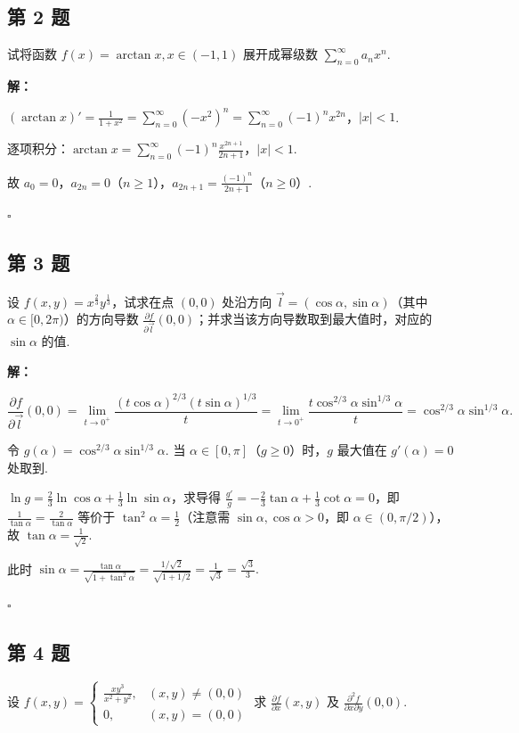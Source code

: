 \documentclass[12pt,a4paper]{article}
\newenvironment{sol}[1][解]{%
  \par\medskip\noindent\textbf{#1：}\itshape\par\noindent\ignorespaces
}{%
  \par\hfill$\square$\par\medskip
}
\begin{document}
\subsection*{第 2 题}
试将函数 $f(x)=\arctan x, x\in(-1,1)$ 展开成幂级数 $\sum_{n=0}^{\infty}a_nx^n$.

\begin{sol}$(\arctan
  x)'=\frac{1}{1+x^2}=\sum_{n=0}^{\infty}(-x^2)^n=\sum_{n=0}^{\infty}(-1)^nx^{2n}$，$|x|<1$.

  逐项积分：$\arctan x=\sum_{n=0}^{\infty}(-1)^n\frac{x^{2n+1}}{2n+1}$，$|x|<1$.

  故 $a_0=0$，$a_{2n}=0$（$n\ge 1$），$a_{2n+1}=\frac{(-1)^n}{2n+1}$（$n\ge 0$）.

\end{sol}
\subsection*{第 3 题}
设 $f(x,y)=x^{\frac{2}{3}}y^{\frac{1}{3}}$，试求在点 $(0,0)$ 处沿方向
$\vec{l}=(\cos\alpha,\sin\alpha)$（其中 $\alpha\in[0,2\pi)$）的方向导数
$\frac{\partial f}{\partial \vec{l}}(0,0)$；并求当该方向导数取到最大值时，对应的 $\sin\alpha$ 的值.

\begin{sol}
  $$\frac{\partial f}{\partial\vec{l}}(0,0)=\lim_{t\to
  0^+}\frac{(t\cos\alpha)^{2/3}(t\sin\alpha)^{1/3}}{t}=\lim_{t\to
  0^+}\frac{t\cos^{2/3}\alpha\sin^{1/3}\alpha}{t}=\cos^{2/3}\alpha\sin^{1/3}\alpha.$$

  令 $g(\alpha)=\cos^{2/3}\alpha\sin^{1/3}\alpha$. 当
  $\alpha\in[0,\pi]$（$g\ge 0$）时，$g$ 最大值在 $g'(\alpha)=0$ 处取到.

  $\ln g=\frac{2}{3}\ln\cos\alpha+\frac{1}{3}\ln\sin\alpha$，求导得
  $\frac{g'}{g}=-\frac{2}{3}\tan\alpha+\frac{1}{3}\cot\alpha=0$，即
  $\frac{1}{\tan\alpha}=\frac{2}{\tan\alpha}$ 等价于
  $\tan^2\alpha=\frac{1}{2}$（注意需 $\sin\alpha,\cos\alpha>0$，即
  $\alpha\in(0,\pi/2)$），故 $\tan\alpha=\frac{1}{\sqrt{2}}$.

  此时
  $\sin\alpha=\frac{\tan\alpha}{\sqrt{1+\tan^2\alpha}}=\frac{1/\sqrt{2}}{\sqrt{1+1/2}}=\frac{1}{\sqrt{3}}=\frac{\sqrt{3}}{3}.$

\end{sol}
\subsection*{第 4 题}
设 $f(x,y)=
\begin{cases}\frac{xy^3}{x^2+y^2}, & (x,y)\ne(0,0) \\ 0, & (x,y)=(0,0)
\end{cases}$ 求 $\frac{\partial f}{\partial x}(x,y)$ 及
$\frac{\partial^2 f}{\partial x \partial y}(0,0)$.
\end{document}
